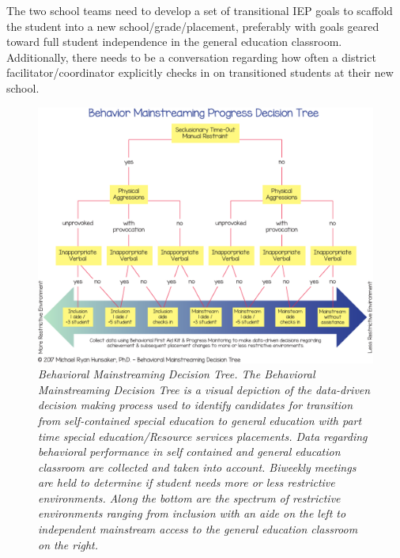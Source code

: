 \documentclass[twoside]{article}
\begin{document}
The two school teams need to develop a set of transitional IEP goals to scaffold the student into a new school/grade/placement, preferably with goals geared toward full student independence in the general education classroom. Additionally, there needs to be a conversation regarding how often a district facilitator/coordinator explicitly checks in on transitioned students at their new school.
%
%
%
%
%
\begin{figure}[htp!]
	\centering
	\includegraphics[width=\textwidth]{BehaviorPipeline.pdf}
	\caption[Behaviroal Mainstreaming Decision Tree]{\textit{Behavioral Mainstreaming Decision Tree. The Behavioral Mainstreaming Decision Tree is a visual depiction of the data-driven decision making process used to identify candidates for transition from self-contained special education to general education with part time special education/Resource services placements. Data regarding behavioral performance in self contained and general education classroom are collected and taken into account. Biweekly meetings are held to determine if student needs more or less restrictive environments. Along the bottom are the spectrum of restrictive environments ranging from inclusion with an aide on the left to independent mainstream access to the general education classroom on the right.}}
	\label{fig3}
\end{figure}
%
%
%


%
%
\end{document}
